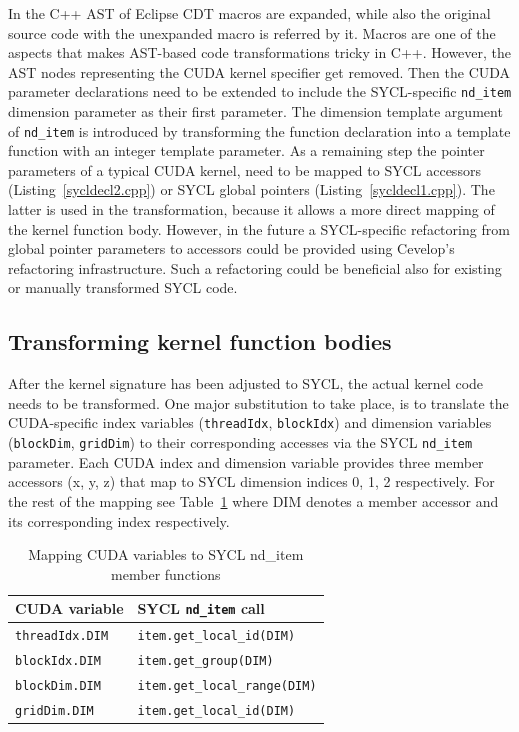 \documentclass[sigconf]{acmart}
\newcommand{\inputsycl}[2]{}
\newcommand{\tcode}[1]{\texttt{#1}}
\begin{document}
In the C++ AST of Eclipse CDT macros are expanded, while also the original source code with the unexpanded macro is referred by it. 
Macros are one of the aspects that makes AST-based code transformations tricky in C++. 
However, the AST nodes representing the CUDA kernel specifier get removed. 
Then the CUDA parameter declarations need to be extended to include the SYCL-specific \tcode{nd_item} dimension parameter as their first parameter. The dimension template argument of \tcode{nd_item} is introduced by transforming the function declaration into a template function with an integer template parameter. 
As a remaining step the pointer parameters of a typical CUDA kernel, need to be mapped to SYCL accessors (Listing~\ref{sycldecl2.cpp}) or SYCL global pointers (Listing~\ref{sycldecl1.cpp}). 
The latter is used in the transformation, because it allows a more direct mapping of the kernel function body. 
However, in the future a SYCL-specific refactoring from global pointer parameters to accessors could be provided using Cevelop's refactoring infrastructure. Such a refactoring could be beneficial also for existing or manually transformed SYCL code.
\inputsycl{sycldecl1.cpp}{SYCL declaration with global pointers}
\inputsycl{sycldecl2.cpp}{SYCL declaration with accessors}

\subsection{Transforming kernel function bodies}
After the kernel signature has been adjusted to SYCL, the actual kernel code needs to be transformed. One major substitution to take place, is to translate the CUDA-specific index variables (\tcode{threadIdx}, \tcode{blockIdx}) and dimension variables (\tcode{blockDim}, \tcode{gridDim}) to their corresponding accesses via the SYCL \tcode{nd_item} parameter. Each CUDA index and dimension variable provides three member accessors (x, y, z) that map to SYCL dimension indices 0, 1, 2 respectively. For the rest of the mapping see Table~\ref{tab:mapping} where DIM denotes a member accessor and its corresponding index respectively.
\begin{table}[htp]
\begin{center}\begin{tabular}{|l|l|}
\hline
 CUDA variable & SYCL \tcode{nd_item} call \\\hline
  \tcode{threadIdx.DIM} & \tcode{item.get_local_id(DIM)} \\\hline
   \tcode{blockIdx.DIM} & \tcode{item.get_group(DIM)} \\\hline
    \tcode{blockDim.DIM} & \tcode{item.get_local_range(DIM)} \\\hline
     \tcode{gridDim.DIM} & \tcode{item.get_local_id(DIM)} \\\hline
      \end{tabular} 
      \caption{Mapping CUDA variables to SYCL nd_item member functions}
\label{tab:mapping}
\end{center}
\end{table}
      
\end{document}

